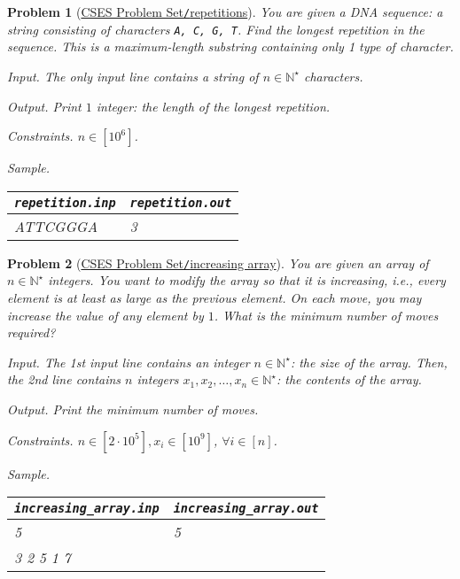 \documentclass{article}
\newtheorem{problem}{Problem}
\begin{document}
\begin{problem}[\href{https://cses.fi/problemset/task/1069}{CSES Problem Set{\tt/}repetitions}]
    You are given a DNA sequence: a string consisting of characters {\tt A, C, G, T}. Find the longest repetition in the sequence. This is a maximum-length substring containing only 1 type of character.
    \item {\sf Input.} The only input line contains a string of $n\in\mathbb{N}^\star$ characters.
    \item {\sf Output.} Print $1$ integer: the length of the longest repetition.
    \item {\sf Constraints.} $n\in[10^6]$.
    \item {\sf Sample.}
    \begin{table}[H]
        \centering
        \begin{tabular}{|l|l|}
            \hline
            \verb|repetition.inp| & \verb|repetition.out| \\
            \hline
            ATTCGGGA & 3 \\
            \hline
        \end{tabular}
    \end{table}
\end{problem}

\begin{problem}[\href{https://cses.fi/problemset/task/1094}{CSES Problem Set{\tt/}increasing array}]
    You are given an array of $n\in\mathbb{N}^\star$ integers. You want to modify the array so that it is increasing, i.e., every element is at least as large as the previous element. On each move, you may increase the value of any element by $1$. What is the minimum number of moves required?
    \item {\sf Input.} The 1st input line contains an integer $n\in\mathbb{N}^\star$: the size of the array. Then, the 2nd line contains $n$ integers $x_1,x_2,\ldots,x_n\in\mathbb{N}^\star$: the contents of the array.
    \item {\sf Output.} Print the minimum number of moves.
    \item {\sf Constraints.} $n\in[2\cdot10^5],x_i\in[10^9]$, $\forall i\in[n]$.
    \item {\sf Sample.}
    \begin{table}[H]
        \centering
        \begin{tabular}{|l|l|}
            \hline
            \verb|increasing_array.inp| & \verb|increasing_array.out| \\
            \hline
            5 & 5 \\
            3 2 5 1 7 & \\
            \hline
        \end{tabular}
    \end{table}
\end{problem}
\end{document}
